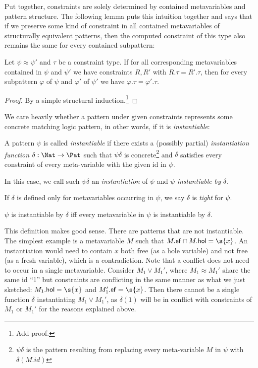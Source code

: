 \documentclass{mgr}
\begin{document}
Put together, constraints are solely determined by contained metavariables and pattern structure.
The following lemma puts this intuition together and says that if we preserve some kind of constraint in all contained metavariables of structurally equivalent patterns, then the computed constraint of this type also remains the same for every contained subpattern:
\begin{lemma*}
  \label{lemma:constraints}
  Let $\psi \approx \psi'$ and $\tau$ be a constraint type.
  If for all corresponding metavariables contained in $\psi$ and $\psi'$  we have constraints $R, R'$ with $R.\tau = R'.\tau$, then for every subpattern $\varphi$ of $\psi$ and $\varphi'$ of $\psi'$  we have $\varphi.\tau = \varphi'.\tau$.
  \begin{proof}
    By a simple structural induction.\footnote{Add proof.}
  \end{proof}
\end{lemma*}

We care heavily whether a pattern under given constraints represents some concrete matching logic pattern, in other words, if it is \emph{instantiable}:
\begin{definition}
  \label{def:instant}
  A pattern $\psi$ is called \emph{instantiable} if there exists a (possibly partial) \emph{instantiation function} $\delta : \Nat \to \Pat$ such that $\psi \delta$ is concrete\footnote{$\psi\delta$ is the pattern resulting from replacing every meta-variable $M$ in $\psi$ with $\delta(M.id)$} and $\delta$ satisfies every constraint of every meta-variable with the given id in $\psi$.

  In this case, we call such $\psi \delta$ an \emph{instantiation} of $\psi$ and $\psi$ \emph{instantiable by} $\delta$.

  If $\delta$ is defined only for metavariables occurring in $\psi$, we say $\delta$ is \emph{tight} for $\psi$.
\end{definition}

\begin{proposition}
  \label{prop:inst_distro}
  $\psi$ is instantiable by $\delta$ iff every metavariable in $\psi$ is instantiable by $\delta$.
\end{proposition}

This definition makes good sense.
There are patterns that are not instantiable.
The simplest example is a metavariable $M$ such that $M.\Ef \cap M.\Hol = \s{x}$.
An instantiation would need to contain $x$ both free (as a hole variable) and not free (as a fresh variable), which is a contradiction.
Note that a conflict does not need to occur in a single metavariable.
Consider $M_1 \lor M_1'$, where $M_1 \approx M_1'$ share the same id ``1''  but constraints are conflicting in the same manner as what we just sketched: $M_1.\Hol = \s{x}$ and $M_1'.\Ef = \s{x}$.
Then there cannot be a single function $\delta$ instantiating $M_1 \lor M_1'$, as $\delta(1)$ will be in conflict with constraints of $M_1$ or $M_1'$ for the reasons explained above.
\end{document}
